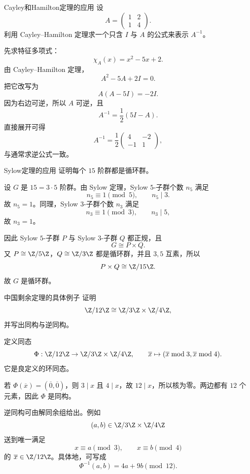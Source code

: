 \begin{problem}{Cayley和Hamilton定理的应用}
\medium
设
\[
A=\begin{pmatrix}1&2\\1&4\end{pmatrix}.
\]
利用 Cayley--Hamilton 定理求一个只含 $I$ 与 $A$ 的公式来表示 $A^{-1}$。
\end{problem}
\begin{solution}
先求特征多项式：
\[
\chi_A(x)=x^2-5x+2.
\]
由 Cayley--Hamilton 定理，
\[
A^2-5A+2I=0.
\]
把它改写为
\[
A(A-5I)=-2I.
\]
因为右边可逆，所以 $A$ 可逆，且
\[
A^{-1}=\frac{1}{2}(5I-A).
\]
直接展开可得
\[
A^{-1}=\frac12
\begin{pmatrix}
4&-2\\-1&1
\end{pmatrix},
\]
与通常求逆公式一致。
\end{solution}

\begin{problem}{Sylow定理的应用}
\medium
证明每个 $15$ 阶群都是循环群。
\end{problem}
\begin{solution}
设 $G$ 是 $15=3\cdot5$ 阶群。由 Sylow 定理，Sylow $5$-子群个数 $n_5$ 满足
\[
n_5\equiv1\pmod5,
\qquad n_5\mid3.
\]
故 $n_5=1$。同理，Sylow $3$-子群个数 $n_3$ 满足
\[
n_3\equiv1\pmod3,
\qquad n_3\mid5,
\]
故 $n_3=1$。

因此 Sylow $5$-子群 $P$ 与 Sylow $3$-子群 $Q$ 都正规，且
\[
G\cong P\times Q.
\]
又 $P\cong\Z/5\Z$，$Q\cong\Z/3\Z$ 都是循环群，并且 $3,5$ 互素，所以
\[
P\times Q\cong\Z/15\Z.
\]
故 $G$ 是循环群。
\end{solution}

\begin{problem}{中国剩余定理的具体例子}
\medium
证明
\[
\Z/12\Z\cong \Z/3\Z\times\Z/4\Z,
\]
并写出同构与逆同构。
\end{problem}
\begin{solution}
定义同态
\[
\Phi:\Z/12\Z\to\Z/3\Z\times\Z/4\Z,
\qquad
\overline x\mapsto(\overline x\bmod3,\overline x\bmod4).
\]
它是良定义的环同态。

若 $\Phi(\overline x)=(\overline0,\overline0)$，则 $3\mid x$ 且 $4\mid x$，故 $12\mid x$，所以核为零。两边都有 $12$ 个元素，因此 $\Phi$ 是同构。

逆同构可由解同余组给出。例如
\[
(a,b)\in\Z/3\Z\times\Z/4\Z
\]
送到唯一满足
\[
x\equiv a\pmod3,
\qquad x\equiv b\pmod4
\]
的 $\overline x\in\Z/12\Z$。具体地，可写成
\[
\Phi^{-1}(a,b)=4a+9b\pmod{12}.
\]
\end{solution}

